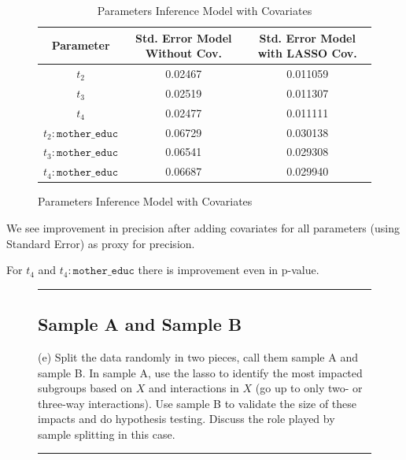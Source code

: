 \documentclass{article}
\newenvironment{colorparagraph}[1]{\par\color{#1}}{\par}
\begin{document}
\begin{figure}[H]
  \begin{table}[H]
  \centering
  \begin{tabular}{|c|cc|}
    \hline
    Parameter & Std. Error Model Without Cov. & Std. Error Model with LASSO Cov. \\
    \hline
    $t_2$                       & 0.02467       & 0.011059 \\
    $t_3$                       & 0.02519       & 0.011307 \\
    $t_4$                       & 0.02477       & 0.011111 \\
    $t_2:\texttt{mother\_educ}$ & 0.06729       & 0.030138 \\
    $t_3:\texttt{mother\_educ}$ & 0.06541       & 0.029308 \\
    $t_4:\texttt{mother\_educ}$ & 0.06687       & 0.029940 \\
    \hline
  \end{tabular}
  \caption{Parameters Inference Model with Covariates}
\end{table}
\end{figure}

We see improvement in precision after adding covariates for all parameters (using Standard Error) as proxy for precision.

For $t_4$ and $t_4:\texttt{mother\_educ}$ there is improvement even in p-value.


\begin{figure}[H]
\begin{colorparagraph}{questioncolor}
\rule{\textwidth}{0.5pt}
\subsection{Sample A and Sample B}
\label{q3e}
(e) Split the data randomly in two pieces, call them sample A and sample B. In sample A, use the lasso to identify the most impacted subgroups based on \( X \) and interactions in \( X \) (go up to only two- or three-way interactions). Use sample B to validate the size of these impacts and do hypothesis testing. Discuss the role played by sample splitting in this case.

\rule{\textwidth}{0.5pt}
\end{colorparagraph}
\end{figure}
\end{document}
